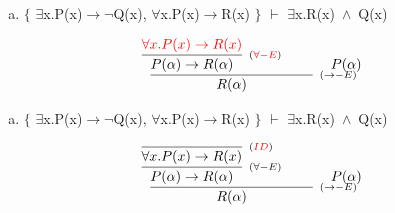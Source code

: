 \documentclass[aspectratio=43]{beamer}
\newcommand{\ria}{$\rightarrow$}
\newcommand{\fall}{$\forall$}
\newcommand{\ex}{$\exists$}
\newcommand{\nao}{$\neg$}
\newcommand{\andd}{$\wedge$}
\begin{document}
     \begin{frame}[fragile]
    
    	\begin{enumerate}[d)]
			\item $\{$ \ex x.P(x)\ria \nao Q(x), \fall x.P(x)\ria R(x) $\}$ $\vdash$ \ex x.R(x)\ \andd\ Q(x) \\
		\end{enumerate}
        
        \vspace{70pt}
        
        \[
        \begin{array}{c}
		
        	\infer[_{(\to -E)}]
            	{R(\alpha)}
            	{\infer[_{(\textcolor{red}{\forall -E})}]
                	{P(\alpha) \rightarrow R(\alpha)} 
                    {\textcolor{red}{\forall x.P(x)\to R(x)}} 
            	\hspace{35pt}
                P(\alpha)
                }
		\end{array}
        \]
        
	\end{frame}
    
    \begin{frame}[fragile]
    
    	\begin{enumerate}[d)]
			\item $\{$ \ex x.P(x)\ria \nao Q(x), \fall x.P(x)\ria R(x) $\}$ $\vdash$ \ex x.R(x)\ \andd\ Q(x) \\
		\end{enumerate}
        
        \vspace{70pt}
        
        \[
        \begin{array}{c}
		
        	\infer[_{(\to -E)}]
            	{R(\alpha)}
            	{\infer[_{(\forall -E)}]
                	{P(\alpha) \rightarrow R(\alpha)} 
                    {\infer[_{(\textcolor{red}{ID})}]
                    	{\forall x.P(x)\to R(x)}
                    	{}
                    } 
            	\hspace{35pt}
                P(\alpha)
                }
		\end{array}
        \]
        
	\end{frame}
    
\end{document}
